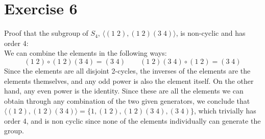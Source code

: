 \documentclass{article}
\begin{document}
    \section*{Exercise 6}
    Proof that the subgroup of $S_4$,
    $\langle (1\;2), (1\;2)(3\;4) \rangle$,
    is non-cyclic and has order 4: \\
    We can combine the elements in the following ways:
    \[ (1\;2) \circ (1\;2)(3\;4) = (3\;4) \qquad
    (1\;2)(3\;4) \circ (1\;2) = (3\;4) \]
    Since the elements are all disjoint 2-cycles,
    the inverses of the elements are the elements themselves,
    and any odd power is also the element itself.
    On the other hand, any even power is the identity.
    Since these are all the elements we can obtain
    through any combination of the two given generators,
    we conclude that $\langle (1\;2), (1\;2)(3\;4) \rangle
    = \{1, (1\;2), (1\;2)(3\;4), (3\;4)\}$,
    which trivially has order 4, and is non cyclic
    since none of the elements individually can generate the group.
\end{document}
